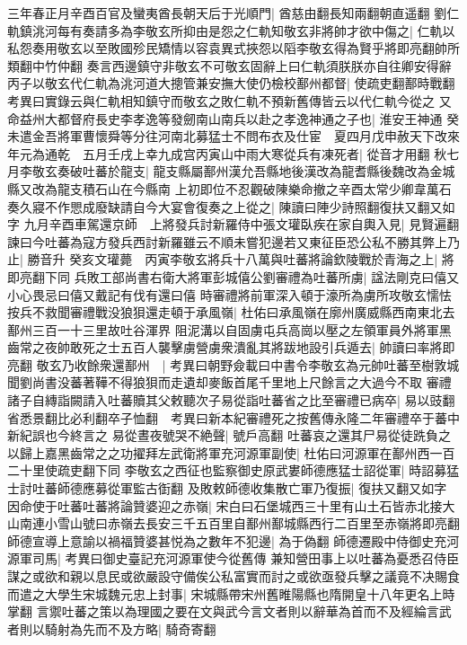 三年春正月辛酉百官及蠻夷酋長朝天后于光順門|{
	酋慈由翻長知兩翻朝直遥翻}
劉仁軌鎮洮河每有奏請多為李敬玄所抑由是怨之仁軌知敬玄非將帥才欲中傷之|{
	仁軌以私怨奏用敬玄以至敗國殄民矯情以容袁異式挾怨以䧟李敬玄得為賢乎將即亮翻帥所類翻中竹仲翻}
奏言西邊鎮守非敬玄不可敬玄固辭上曰仁軌須朕朕亦自往卿安得辭丙子以敬玄代仁軌為洮河道大摠管兼安撫大使仍檢校鄯州都督|{
	使疏吏翻鄯時戰翻　考異曰實錄云與仁軌相知鎮守而敬玄之敗仁軌不預新舊傳皆云以代仁軌今從之}
又命益州大都督府長史李孝逸等發劒南山南兵以赴之孝逸神通之子也|{
	淮安王神通}
癸未遣金吾將軍曹懷舜等分往河南北募猛士不問布衣及仕宦　夏四月戊申赦天下改來年元為通乾　五月壬戌上幸九成宫丙寅山中雨大寒從兵有凍死者|{
	從音才用翻}
秋七月李敬玄奏破吐蕃於龍支|{
	龍支縣屬鄯州漢允吾縣地後漢改為龍耆縣後魏改為金城縣又改為龍支積石山在今縣南}
上初即位不忍觀破陳樂命撤之辛酉太常少卿韋萬石奏久寢不作愳成廢缺請自今大宴會復奏之上從之|{
	陳讀曰陣少詩照翻復扶又翻又如字}
九月辛酉車駕還京師　上將發兵討新羅侍中張文瓘臥疾在家自輿入見|{
	見賢遍翻}
諫曰今吐蕃為寇方發兵西討新羅雖云不順未嘗犯邊若又東征臣恐公私不勝其弊上乃止|{
	勝音升}
癸亥文瓘薨　丙寅李敬玄將兵十八萬與吐蕃將論欽陵戰於青海之上|{
	將即亮翻下同}
兵敗工部尚書右衛大將軍彭城僖公劉審禮為吐蕃所虜|{
	諡法剛克曰僖又小心畏忌曰僖又戴記有伐有還曰僖}
時審禮將前軍深入頓于濠所為虜所攻敬玄懦怯按兵不救聞審禮戰没狼狽還走頓于承風嶺|{
	杜佑曰承風嶺在廓州廣威縣西南東北去鄯州三百一十三里故吐谷渾界}
阻泥溝以自固虜屯兵高崗以壓之左領軍員外將軍黑齒常之夜帥敢死之士五百人襲擊虜營虜衆潰亂其將跋地設引兵遁去|{
	帥讀曰率將即亮翻}
敬玄乃收餘衆還鄯州　|{
	考異曰朝野僉載曰中書令李敬玄為元帥吐蕃至樹敦城聞劉尚書没蕃著鞾不得狼狽而走遺却麥飯首尾千里地上尺餘言之大過今不取}
審禮諸子自縳詣闕請入吐蕃贖其父敕聽次子易從詣吐蕃省之比至審禮已病卒|{
	易以豉翻省悉景翻比必利翻卒子恤翻　考異曰新本紀審禮死之按舊傳永隆二年審禮卒于蕃中新紀誤也今終言之}
易從晝夜號哭不絶聲|{
	號戶高翻}
吐蕃哀之還其尸易從徒跣負之以歸上嘉黑齒常之之功擢拜左武衛將軍充河源軍副使|{
	杜佑曰河源軍在鄯州西一百二十里使疏吏翻下同}
李敬玄之西征也監察御史原武婁師德應猛士詔從軍|{
	時詔募猛士討吐蕃師德應募從軍監古衘翻}
及敗敕師德收集散亡軍乃復振|{
	復扶又翻又如字}
因命使于吐蕃吐蕃將論贊婆迎之赤嶺|{
	宋白曰石堡城西三十里有山土石皆赤北接大山南連小雪山號曰赤嶺去長安三千五百里自鄯州鄯城縣西行二百里至赤嶺將即亮翻}
師德宣導上意諭以禍福贊婆甚悦為之數年不犯邊|{
	為于偽翻}
師德遷殿中侍御史充河源軍司馬|{
	考異曰御史臺記充河源軍使今從舊傳}
兼知營田事上以吐蕃為憂悉召侍臣謀之或欲和親以息民或欲嚴設守備俟公私富實而討之或欲亟發兵擊之議竟不决賜食而遣之大學生宋城魏元忠上封事|{
	宋城縣帶宋州舊睢陽縣也隋開皇十八年更名上時掌翻}
言禦吐蕃之策以為理國之要在文與武今言文者則以辭華為首而不及經綸言武者則以騎射為先而不及方略|{
	騎奇寄翻}

